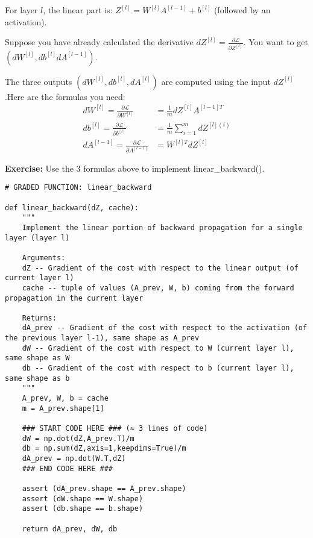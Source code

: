 {For layer $l$, the linear part is: $Z^{[l]} = W^{[l]} A^{[l-1]} + b^{[l]}$ (followed by an activation).

Suppose you have already calculated the derivative $dZ^{[l]} = \frac{\partial \mathcal{L} }{\partial Z^{[l]}}$. You want to get $(dW^{[l]}, db^{[l]} dA^{[l-1]})$.

The three outputs $(dW^{[l]}, db^{[l]}, dA^{[l]})$ are computed using the input $dZ^{[l]}$.Here are the formulas you need:
\begin{align}
dW^{[l]} = \frac{\partial \mathcal{L} }{\partial W^{[l]}} &= \frac{1}{m} dZ^{[l]} A^{[l-1] T} \\
db^{[l]} = \frac{\partial \mathcal{L} }{\partial b^{[l]}} &= \frac{1}{m} \sum_{i = 1}^{m} dZ^{[l](i)}\\
dA^{[l-1]} = \frac{\partial \mathcal{L} }{\partial A^{[l-1]}} &= W^{[l] T} dZ^{[l]} 
\end{align}

{\textbf {Exercise:}} Use the 3 formulas above to implement linear\_backward().

\begin{verbatim}
# GRADED FUNCTION: linear_backward

def linear_backward(dZ, cache):
    """
    Implement the linear portion of backward propagation for a single layer (layer l)

    Arguments:
    dZ -- Gradient of the cost with respect to the linear output (of current layer l)
    cache -- tuple of values (A_prev, W, b) coming from the forward propagation in the current layer

    Returns:
    dA_prev -- Gradient of the cost with respect to the activation (of the previous layer l-1), same shape as A_prev
    dW -- Gradient of the cost with respect to W (current layer l), same shape as W
    db -- Gradient of the cost with respect to b (current layer l), same shape as b
    """
    A_prev, W, b = cache
    m = A_prev.shape[1]

    ### START CODE HERE ### (≈ 3 lines of code)
    dW = np.dot(dZ,A_prev.T)/m
    db = np.sum(dZ,axis=1,keepdims=True)/m
    dA_prev = np.dot(W.T,dZ)
    ### END CODE HERE ###
    
    assert (dA_prev.shape == A_prev.shape)
    assert (dW.shape == W.shape)
    assert (db.shape == b.shape)
    
    return dA_prev, dW, db
\end{verbatim}




}

